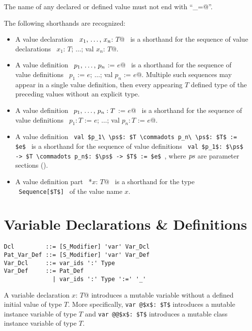 The name of any declared or defined value must not end with ``\lstinline@_=@''. 

The following shorthands are recognized: 
\begin{itemize}
  \item[] A value declaration ~\lstinline@val $x_1 ,\, \ldots ,\, x_n$: $T$@~ is a shorthand for the sequence of value declarations ~\lstinline@val $x_1$: $T$; $\ldots$; val $x_n$: $T$@. 

  \item[] A value definition ~\lstinline@val $p_1 ,\, \ldots ,\, p_n$ := $e$@~ is a shorthand for the sequence of value definitions ~\lstinline@val $p_1$ := $e$; $\ldots$; val $p_n$ := $e$@. Multiple such sequences may appear in a single value definition, then every appearing $T$ defined type of the preceding values without an explicit type. 

  \item[] A value definition ~\lstinline@val $p_1 ,\, \ldots ,\, p_n: T$ := $e$@~ is a shorthand for the sequence of value definitions ~\lstinline@val $p_1: T$ := $e$; $\ldots$; val $p_n: T$ := $e$@.

  \item[] A value definition ~\lstinline!val $p_1\ \ps$: $T \commadots p_n\ \ps$: $T$ := $e$!~ is a shorthand for the sequence of value definitions ~\lstinline!val $p_1$: $\ps$ -> $T \commadots p_n$: $\ps$ -> $T$ := $e$!~, where $\mbox{\sl ps}$ are parameter sections ().

  \item[] A value definition part ~\lstinline@*$x$: $T$@~ is a shorthand for the type ~\lstinline!Sequence[$T$]!~ of the value name $x$. 
\end{itemize}






\section{Variable Declarations \& Definitions}
\label{sec:variable-dcl-def}

\syntax\begin{lstlisting}
Dcl         ::= [S_Modifier] 'var' Var_Dcl
Pat_Var_Def ::= [S_Modifier] 'var' Var_Def
Var_Dcl     ::= var_ids ':' Type
Var_Def     ::= Pat_Def
              | var_ids ':' Type ':=' '_'
\end{lstlisting}

A variable declaration \lstinline@var $x$: $T$@ introduces a mutable variable without a defined initial value of type $T$. More specifically, \lstinline+var @$x$: $T$+ introduces a mutable instance variable of type $T$ and \lstinline+var @@$x$: $T$+ introduces a mutable class instance variable of type $T$. 

